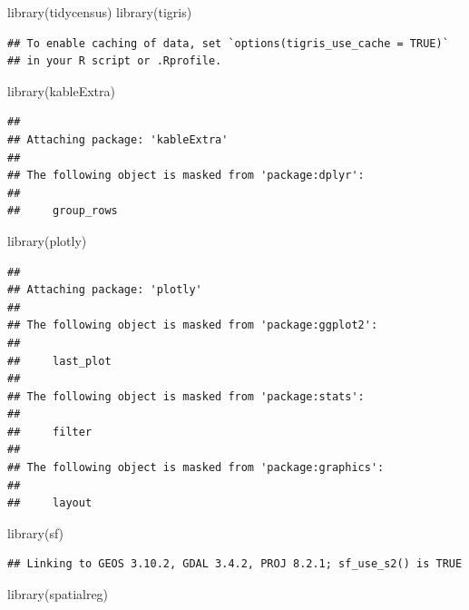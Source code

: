\documentclass[
]{article}
\newenvironment{Shaded}{\begin{snugshade}}{\end{snugshade}}
\newcommand{\FunctionTok}[1]{\textcolor[rgb]{0.00,0.00,0.00}{#1}}
\newcommand{\NormalTok}[1]{#1}
\begin{document}
\begin{Shaded}
\begin{Highlighting}[]
\FunctionTok{library}\NormalTok{(tidycensus)}
\FunctionTok{library}\NormalTok{(tigris)}
\end{Highlighting}
\end{Shaded}

\begin{verbatim}
## To enable caching of data, set `options(tigris_use_cache = TRUE)`
## in your R script or .Rprofile.
\end{verbatim}

\begin{Shaded}
\begin{Highlighting}[]
\FunctionTok{library}\NormalTok{(kableExtra)}
\end{Highlighting}
\end{Shaded}

\begin{verbatim}
## 
## Attaching package: 'kableExtra'
## 
## The following object is masked from 'package:dplyr':
## 
##     group_rows
\end{verbatim}

\begin{Shaded}
\begin{Highlighting}[]
\FunctionTok{library}\NormalTok{(plotly)}
\end{Highlighting}
\end{Shaded}

\begin{verbatim}
## 
## Attaching package: 'plotly'
## 
## The following object is masked from 'package:ggplot2':
## 
##     last_plot
## 
## The following object is masked from 'package:stats':
## 
##     filter
## 
## The following object is masked from 'package:graphics':
## 
##     layout
\end{verbatim}

\begin{Shaded}
\begin{Highlighting}[]
\FunctionTok{library}\NormalTok{(sf)}
\end{Highlighting}
\end{Shaded}

\begin{verbatim}
## Linking to GEOS 3.10.2, GDAL 3.4.2, PROJ 8.2.1; sf_use_s2() is TRUE
\end{verbatim}

\begin{Shaded}
\begin{Highlighting}[]
\FunctionTok{library}\NormalTok{(spatialreg)}
\end{Highlighting}
\end{Shaded}
\end{document}
